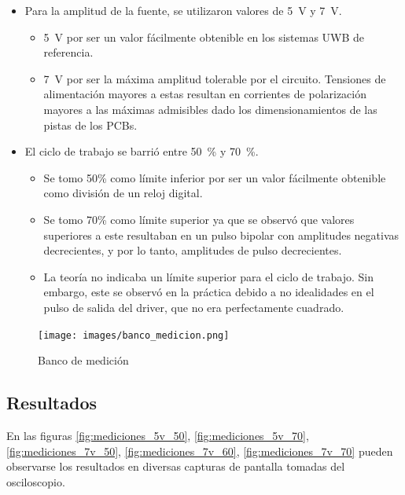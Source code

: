 \begin{itemize}
    \item Para la amplitud de la fuente, se utilizaron valores de \qty{5}{\volt} y
        \qty{7}{\volt}.
        \begin{itemize}
            \item \qty{5}{\volt} por ser un valor fácilmente obtenible en los
                sistemas UWB de referencia.
            \item \qty{7}{\volt} por ser la máxima amplitud tolerable por el circuito.
                Tensiones de alimentación mayores a estas resultan en corrientes de
                polarización mayores a las máximas admisibles dado los
                dimensionamientos de las pistas de los PCBs.
        \end{itemize}
    \item El ciclo de trabajo se barrió entre \qty{50}{\percent} y
        \qty{70}{\percent}.
        \begin{itemize}
            \item Se tomo 50\% como límite inferior por ser un valor fácilmente
                obtenible como división de un reloj digital.
            \item Se tomo 70\% como límite superior ya que se observó que valores
                superiores a este resultaban en un pulso bipolar con amplitudes
                negativas decrecientes, y por lo tanto, amplitudes de pulso
                decrecientes.
            \item La teoría no indicaba un límite superior para el ciclo de
                trabajo. Sin embargo, este se observó en la práctica debido a no
                idealidades en el pulso de salida del driver, que no era
                perfectamente cuadrado.
        \end{itemize}
\end{itemize}

\begin{figure}
  \centering
    \texttt{[image: images/banco\_medicion.png]}
    \caption{Banco de medición}
    \label{fig:banco_medicion}
\end{figure}

\subsection{Resultados}

En las figuras \ref{fig:mediciones_5v_50}, \ref{fig:mediciones_5v_70},
\ref{fig:mediciones_7v_50}, \ref{fig:mediciones_7v_60},
\ref{fig:mediciones_7v_70} pueden observarse los resultados en diversas capturas de pantalla
tomadas del osciloscopio.

